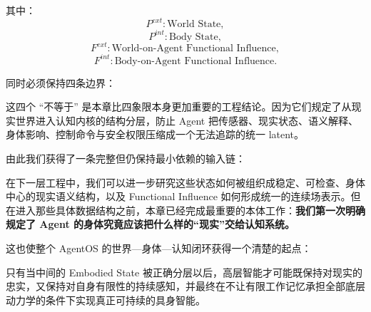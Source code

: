 其中：
\[
P^{ext}
:
\text{World State},
\]
\[
P^{int}
:
\text{Body State},
\]
\[
F^{ext}
:
\text{World-on-Agent Functional Influence},
\]
\[
F^{int}
:
\text{Body-on-Agent Functional Influence}.
\]

同时必须保持四条边界：

\begin{statementbox}
\centering
{}
\end{statementbox}

\begin{statementbox}
\centering
{}
\end{statementbox}

\begin{statementbox}
\centering
{}
\end{statementbox}

\begin{statementbox}
\centering
{}
\end{statementbox}

这四个 ``不等于'' 是本章比四象限本身更加重要的工程结论。因为它们规定了从现实世界进入认知内核的结构分层，防止 Agent 把传感器、现实状态、语义解释、身体影响、控制命令与安全权限压缩成一个无法追踪的统一 latent。

由此我们获得了一条完整但仍保持最小依赖的输入链：

\begin{statementbox}
\centering
{}
\end{statementbox}

在下一层工程中，我们可以进一步研究这些状态如何被组织成稳定、可检查、身体中心的现实语义结构，以及 Functional Influence 如何形成统一的连续场表示。但在进入那些具体数据结构之前，本章已经完成最重要的本体工作：\textbf{我们第一次明确规定了 Agent 的身体究竟应该把什么样的``现实''交给认知系统。}

这也使整个 AgentOS 的世界—身体—认知闭环获得一个清楚的起点：
\begin{statementbox}
\centering
{}
\end{statementbox}
只有当中间的 Embodied State 被正确分层以后，高层智能才可能既保持对现实的忠实，又保持对自身有限性的持续感知，并最终在不让有限工作记忆承担全部底层动力学的条件下实现真正可持续的具身智能。
